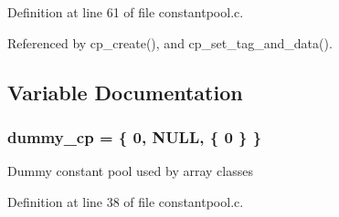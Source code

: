 Definition at line 61 of file constantpool.c.



Referenced by cp\_\-create(), and cp\_\-set\_\-tag\_\-and\_\-data().



\subsection{Variable Documentation}
\subsubsection[{dummy\_\-cp}]{ {\bf dummy\_\-cp} = \{ 0, NULL, \{ 0 \} \}\hspace{0.3cm}{\ttfamily  [static]}}\label{constantpool_8c_a76f70385d2bef1b1710472e20273c340}
Dummy constant pool used by array classes 

Definition at line 38 of file constantpool.c.

